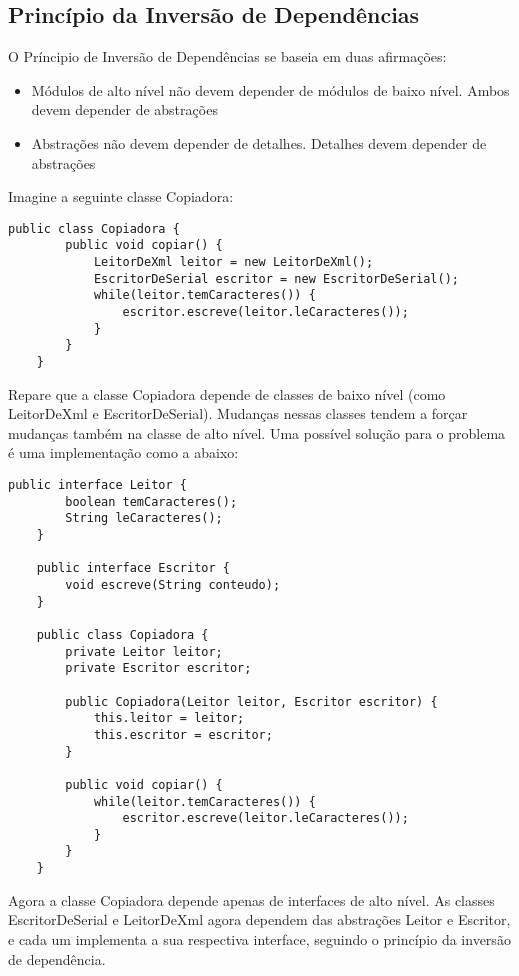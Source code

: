 \subsection{Princípio da Inversão de Dependências}
\label{subsec:dip}

O Príncipio de Inversão de Dependências se baseia em duas afirmações:

\begin{itemize}
	\item Módulos de alto nível não devem depender de módulos de baixo nível. Ambos devem depender de abstrações
	\item Abstrações não devem depender de detalhes. Detalhes devem depender de abstrações
\end{itemize}

Imagine a seguinte classe Copiadora:

\begin{lstlisting}[frame=trbl]
	public class Copiadora {
		public void copiar() {
			LeitorDeXml leitor = new LeitorDeXml();
			EscritorDeSerial escritor = new EscritorDeSerial();
			while(leitor.temCaracteres()) {
				escritor.escreve(leitor.leCaracteres());
			}
		}
	}
\end{lstlisting}

Repare que a classe Copiadora depende de classes de baixo nível (como LeitorDeXml e EscritorDeSerial). Mudanças nessas classes tendem a forçar
mudanças também na classe de alto nível. Uma possível solução para o problema é uma implementação como a abaixo:

\begin{lstlisting}[frame=trbl]
	public interface Leitor {
		boolean temCaracteres();
		String leCaracteres();
	}
	
	public interface Escritor {
		void escreve(String conteudo);
	}
	
	public class Copiadora {
		private Leitor leitor;
		private Escritor escritor;
		
		public Copiadora(Leitor leitor, Escritor escritor) {
			this.leitor = leitor;
			this.escritor = escritor;
		}
		
		public void copiar() {
			while(leitor.temCaracteres()) {
				escritor.escreve(leitor.leCaracteres());
			}
		}
	}
\end{lstlisting}

Agora a classe Copiadora depende apenas de interfaces de alto nível. As classes EscritorDeSerial e LeitorDeXml agora dependem das
abstrações Leitor e Escritor, e cada um implementa a sua respectiva interface, seguindo o princípio da inversão de dependência.

